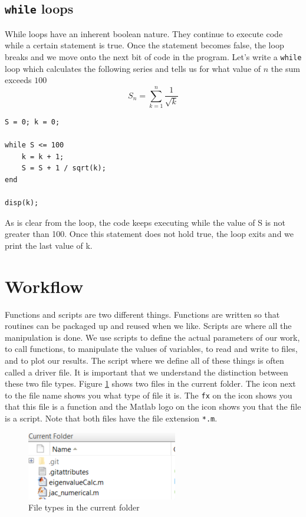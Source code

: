 \documentclass[12pt]{article}
\begin{document}
\subsection{\texttt{while} loops}
While loops have an inherent boolean nature. They continue to execute code while a certain statement is true. Once the statement becomes false, the loop breaks and we move onto the next bit of code in the program. Let's write a \texttt{while} loop which calculates the following series and tells us for what value of $n$ the sum exceeds $100$
\begin{equation}
S_n = \sum_{k=1}^{n} \frac{1}{\sqrt{k}}
\end{equation}
\newpage
\begin{lstlisting}
S = 0; k = 0;

while S <= 100
	k = k + 1;
	S = S + 1 / sqrt(k); 
end

disp(k);
\end{lstlisting}
As is clear from the loop, the code keeps executing while the value of S is not greater than 100. Once this statement does not hold true, the loop exits and we print the last value of k. 

\section{Workflow}
Functions and scripts are two different things. Functions are written so that routines can be packaged up and reused when we like. Scripts are where all the manipulation is done. We use scripts to define the actual parameters of our work, to call functions, to manipulate the values of variables, to read and write to files, and to plot our results. The script where we define all of these things is often called a driver file. It is important that we understand the distinction between these two file types. Figure \ref{fig:sym} shows two files in the current folder. The icon next to the file name shows you what type of file it is. The \texttt{fx} on the icon shows you that this file is a function and the Matlab logo on the icon shows you that the file is a script. Note that both files have the file extension \texttt{*.m}.
\begin{figure}[ht]
\centering
\includegraphics[scale=1]{file_symbols.PNG}
\caption{File types in the current folder}
\label{fig:sym}
\end{figure}
\end{document}
